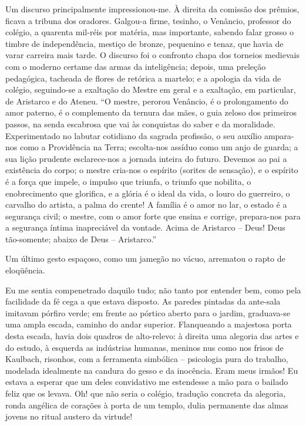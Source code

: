 Um discurso principalmente impressionou{}-me. À direita
da comissão dos prêmios, ficava a tribuna dos oradores. Galgou{}-a
firme, tesinho, o Venâncio, professor do colégio, a quarenta mil{}-réis
por matéria, mas importante, sabendo falar grosso o timbre de
independência, mestiço de bronze, pequenino e tenaz, que havia de varar
carreira mais tarde. O discurso foi o confronto chapa dos torneios
medievais com o moderno certame das armas da inteligência; depois, uma
preleção pedagógica, tacheada de flores de retórica a martelo; e a
apologia da vida de colégio, seguindo{}-se a exaltação do Mestre em
geral e a exaltação, em particular, de Aristarco e do Ateneu. ``O
mestre, perorou Venâncio, é o prolongamento do amor paterno, é o complemento da
ternura das mães, o guia zeloso dos primeiros passos, na senda
escabrosa que vai às conquistas do saber e da moralidade. Experimentado
no labutar cotidiano da sagrada profissão, o seu auxílio ampara{}-nos
como a Providência na Terra; escolta{}-nos assíduo como um anjo de
guarda; a sua lição prudente esclarece{}-nos a jornada inteira do futuro.
Devemos ao pai a existência do corpo; o mestre cria{}-nos o espírito
(sorites de sensação), e o espírito é a força que impele, o impulso que
triunfa, o triunfo que nobilita, o enobrecimento que glorifica, e a
glória é o ideal da vida, o louro do guerreiro, o carvalho do artista,
a palma do crente! A família é o amor no lar, o estado é a segurança
civil; o mestre, com o amor forte que ensina e corrige, prepara{}-nos
para a segurança íntima inapreciável da vontade. Acima de Aristarco -- 
Deus! Deus tão{}-somente; abaixo de Deus -- Aristarco.'' 

Um último gesto espaçoso, como um jamegão no vácuo, arrematou o rapto de
eloqüência. 

Eu me sentia compenetrado daquilo tudo; não tanto por
entender bem, como pela facilidade da fé cega a que estava disposto. As
paredes pintadas da ante{}-sala imitavam pórfiro verde; em frente ao
pórtico aberto para o jardim, graduava{}-se uma ampla escada, caminho
do andar superior. Flanqueando a majestosa porta desta escada, havia
dois quadros de alto{}-relevo: à direita uma alegoria das artes e do
estudo, à esquerda as indústrias humanas, meninos nus como nos frisos
de Kaulbach, risonhos, com a ferramenta simbólica -- psicologia pura
do trabalho, modelada idealmente na candura do gesso e da inocência.
Eram meus irmãos! Eu estava a esperar que um deles convidativo me
estendesse a mão para o bailado feliz que os levava. Oh! que não seria
o colégio, tradução concreta da alegoria, ronda angélica de corações à
porta de um templo, dulia permanente das almas jovens no ritual austero
da virtude! 

